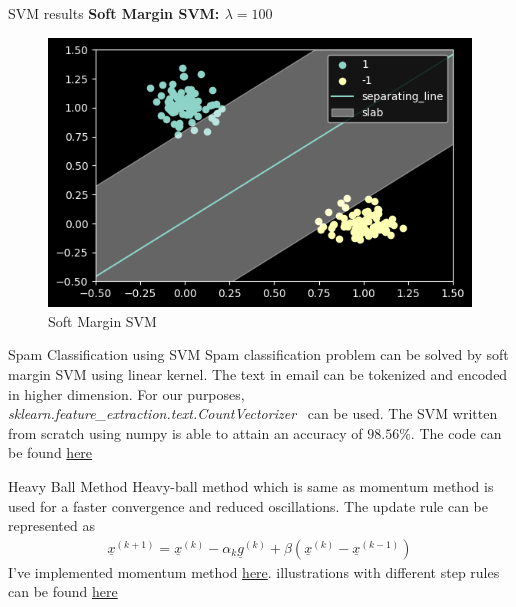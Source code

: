 \documentclass{beamer}
\renewcommand{\vec}[1]{\underline{#1}}
\begin{document}
\begin{frame}{SVM results}
    \textbf{Soft Margin SVM: $\lambda = 100$}
    \begin{figure}[H]
        \centering
        \includegraphics[scale=0.5]{../../results/softmargin.png}
        \caption{Soft Margin SVM}
        \label{softmargin}
    \end{figure}
\end{frame}

\begin{frame}{Spam Classification using SVM}
    Spam classification problem can be solved by soft margin SVM using linear kernel. The text in email can be tokenized and encoded in higher dimension. For our purposes, \emph{sklearn.feature\_extraction.text.CountVectorizer}~\cite{scikit-learn} can be used. The SVM written from scratch using numpy is able to attain an accuracy of $98.56\%$. The code can be found \href{https://github.com/cmaspi/subgradient\_method/blob/main/code/spam\_classification.ipynb}{here}
\end{frame}    

\begin{frame}{Heavy Ball Method}
    Heavy-ball method which is same as momentum method is used for a faster convergence and reduced oscillations. The update rule can be represented as
    \begin{align}
        \vec{x}^{(k+1)} = \vec{x}^{(k)} - \alpha_k\vec{g}^{(k)} + \beta\left(\vec{x}^{(k)}-\vec{x}^{(k-1)}\right)
    \end{align}
    I've implemented momentum method \href{https://github.com/cmaspi/subgradient_method/blob/main/code/svm_numpy.py}{here}. illustrations with different step rules can be found \href{https://github.com/cmaspi/subgradient_method/blob/main/code/step_with_momentum.ipynb}{here}
\end{frame}

{\small


}


\end{document}

